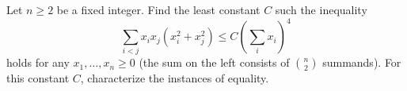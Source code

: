 Let $n \geq 2$ be a fixed integer. Find the least constant $C$ such the inequality
\[\sum_{i<j} x_{i}x_{j} \left(x^{2}_{i}+x^{2}_{j} \right) \leq C \left(\sum_{i}x_{i} \right)^4\]
holds for any $x_{1}, \ldots ,x_{n} \geq 0$ (the sum on the left consists of $\binom{n}{2}$ summands). For this constant $C$,  characterize the instances of equality.
